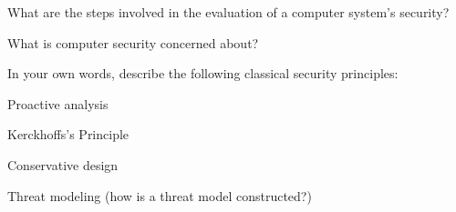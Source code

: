 \documentclass[10pt]{extarticle}
\begin{document}
\begin{questoes}
\item What are the steps involved in the evaluation of a computer system's security?

\item What is computer security concerned about?

\item In your own words, describe the following classical security principles:
\begin{itens}
    \item Proactive analysis
    \item Kerckhoffs's Principle
    \item Conservative design
    \item Threat modeling (how is a threat model constructed?)
\end{itens}

\end{questoes}
\end{document}
